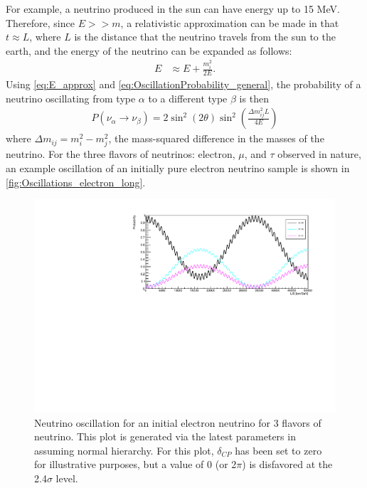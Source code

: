 For example, a neutrino produced in the sun can have energy up to 15 MeV.
Therefore, since $E >> m$, a relativistic approximation can be made in that $t\approx L$, where $L$ is the distance that the neutrino travels from the sun to the earth, and the energy of the neutrino can be expanded as follows:
\begin{align}
E &\approx E+\frac{m_i^2}{2E}.
\label{eq:E_approx}
\end{align}
Using \autoref{eq:E_approx} and \autoref{eq:OscillationProbability_general}, the probability of a neutrino oscillating from type $\alpha$ to a different type $\beta$ is then
\begin{align}
P(\nu_\alpha\rightarrow\nu_\beta) = 2 \sin^2(2\theta)\sin^2(\frac{\Delta m_{ij}^2L}{4E})
\label{eq:OscillationProbability_2nu}
\end{align}
where $\Delta m_{ij} = m_i^2 - m_j^2$, the mass-squared difference in the masses of the neutrino. For the three flavors of neutrinos: electron, $\mu$, and $\tau$ observed in nature, an example oscillation of an initially pure electron neutrino sample is shown in \autoref{fig:Oscillations_electron_long}.
\begin{figure}[tbph]
\centering
\includegraphics[width=0.95\linewidth]{Figures/Oscillation_2017Params_0CP.pdf}
\caption[Neutrino oscillation for an initial electron neutrino for 3 flavors of neutrino]
{Neutrino oscillation for an initial electron neutrino for 3 flavors of neutrino.
This plot is generated via the latest parameters in \cite{Patrignani:2016xqp} assuming normal hierarchy. 
For this plot, $\delta_{CP}$ has been set to zero for illustrative purposes, but a value of 0 (or 2$\pi$) is disfavored at the 2.4$\sigma$ level.}
\label{fig:Oscillations_electron_long}
\end{figure}

